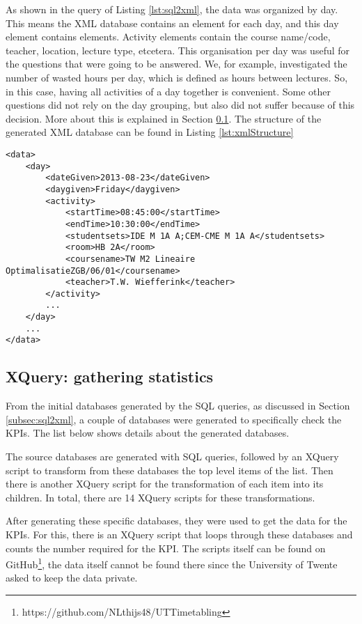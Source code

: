 As shown in the query of Listing \ref{lst:sql2xml}, the data was organized by day. This means the XML database contains an element for each day, and this day element contains  elements. Activity elements contain the course name/code, teacher, location, lecture type, etcetera. This organisation per day was useful for the questions that were going to be answered. We, for example, investigated the number of wasted hours per day, which is defined as hours between lectures. So, in this case, having all activities of a day together is convenient. Some other questions did not rely on the day grouping, but also did not suffer because of this decision. More about this is explained in Section \ref{subsec:xquery}. The structure of the generated XML database can be found in Listing \ref{lst:xmlStructure}

\begin{lstlisting}[caption=XML structure, label=lst:xmlStructure, float=htpb]
<data>
	<day>
		<dateGiven>2013-08-23</dateGiven>
		<daygiven>Friday</daygiven>
		<activity>
			<startTime>08:45:00</startTime>
			<endTime>10:30:00</endTime>
			<studentsets>IDE M 1A A;CEM-CME M 1A A</studentsets>
			<room>HB 2A</room>
			<coursename>TW M2 Lineaire OptimalisatieZGB/06/01</coursename>
			<teacher>T.W. Wiefferink</teacher>
		</activity>
		...
	</day>
	...
</data>
\end{lstlisting}

\subsection{XQuery: gathering statistics} \label{subsec:xquery}
From the initial databases generated by the SQL queries, as discussed in Section \ref{subsec:sql2xml}, a couple of databases were generated to specifically check the KPIs. The list below shows details about the generated databases. 

The source databases are generated with SQL queries, followed by an XQuery script to transform from these databases the top level items of the list. Then there is another XQuery script for the transformation of each item into its children. In total, there are 14 XQuery scripts for these transformations.

After generating these specific databases, they were used to get the data for the KPIs. For this, there is an XQuery script that loops through these databases and counts the number required for the KPI. The scripts itself can be found on GitHub\footnote{https://github.com/NLthijs48/UTTimetabling}, the data itself cannot be found there since the University of Twente asked to keep the data private.

